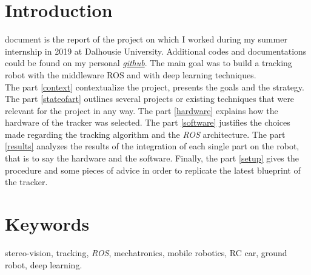 \section*{Introduction}
 document is the report of the project on which 
I worked during my summer internship in 2019 at Dalhousie 
University. Additional codes and documentations
could be found on my personal \href{https://github.com/klipfel}{\textit{github}}.
The main goal was to build a tracking robot
with the middleware ROS and with deep learning techniques.
\\\indent The part \vref{context} contextualize the project, 
presents the goals and the strategy. The part \vref{stateofart}
outlines several projects or existing techniques that 
were relevant for the project in any way. The part 
\vref{hardware} explains how the hardware of the 
tracker was selected. The part \vref{software}
justifies the choices made regarding the 
tracking algorithm and the \textit{ROS} architecture.
The part \vref{results} analyzes the results of the integration
of each single part on the robot, that is to say the hardware and 
the software. Finally, the part \vref{setup} gives the procedure 
and some pieces of advice in order to replicate the latest blueprint
of the tracker.

\section*{Keywords} stereo-vision, tracking, \textit{ROS},
mechatronics, mobile robotics, RC car, ground robot, deep learning.




